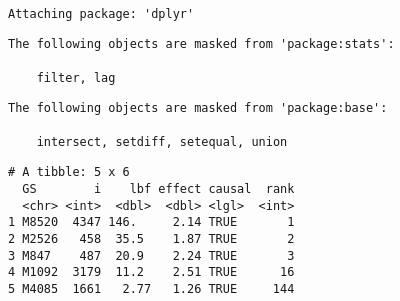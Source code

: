 \documentclass[
  letterpaper,
  DIV=11,
  numbers=noendperiod]{scrreprt}
\newenvironment{Shaded}{\begin{snugshade}}{\end{snugshade}}
\newcommand{\AttributeTok}[1]{\textcolor[rgb]{0.40,0.45,0.13}{#1}}
\newcommand{\DecValTok}[1]{\textcolor[rgb]{0.68,0.00,0.00}{#1}}
\newcommand{\FunctionTok}[1]{\textcolor[rgb]{0.28,0.35,0.67}{#1}}
\newcommand{\NormalTok}[1]{\textcolor[rgb]{0.00,0.23,0.31}{#1}}
\newcommand{\OtherTok}[1]{\textcolor[rgb]{0.00,0.23,0.31}{#1}}
\newcommand{\SpecialCharTok}[1]{\textcolor[rgb]{0.37,0.37,0.37}{#1}}
\begin{document}
\begin{verbatim}

Attaching package: 'dplyr'
\end{verbatim}

\begin{verbatim}
The following objects are masked from 'package:stats':

    filter, lag
\end{verbatim}

\begin{verbatim}
The following objects are masked from 'package:base':

    intersect, setdiff, setequal, union
\end{verbatim}

\begin{Shaded}
\end{Shaded}

\begin{verbatim}
# A tibble: 5 x 6
  GS        i    lbf effect causal  rank
  <chr> <int>  <dbl>  <dbl> <lgl>  <int>
1 M8520  4347 146.     2.14 TRUE       1
2 M2526   458  35.5    1.87 TRUE       2
3 M847    487  20.9    2.24 TRUE       3
4 M1092  3179  11.2    2.51 TRUE      16
5 M4085  1661   2.77   1.26 TRUE     144
\end{verbatim}
\end{document}
